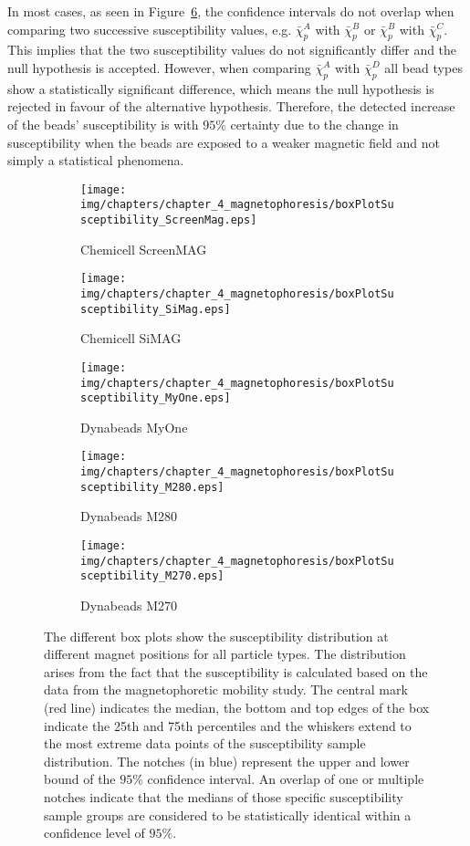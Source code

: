 In most cases, as seen in Figure~\ref{fig:boxPlotSusceptibility}, the confidence intervals do not overlap when comparing two successive susceptibility values, e.g. $\bar{\chi}_{p}^{A}$ with $\bar{\chi}_{p}^{B}$ or $\bar{\chi}_{p}^{B}$ with $\bar{\chi}_{p}^{C}$. This implies that the two susceptibility values do not significantly differ and the null hypothesis is accepted. However, when comparing $\bar{\chi}_{p}^{A}$ with $\bar{\chi}_{p}^{D}$ all bead types show a statistically significant difference, which means the null hypothesis is rejected in favour of the alternative hypothesis. Therefore, the detected increase of the beads' susceptibility is with $95\%$ certainty due to the change in susceptibility when the beads are exposed to a weaker magnetic field and not simply a statistical phenomena.

\begin{figure}[htb]
\begin{subfigure}[b]{.48\textwidth}
\texttt{[image: img/chapters/chapter\_4\_magnetophoresis/boxPlotSusceptibility\_ScreenMag.eps]}
\caption{Chemicell ScreenMAG}\label{fig:boxPlotSus_ScreenMag}
\end{subfigure}
\hfill
\begin{subfigure}[b]{.48\textwidth}
\texttt{[image: img/chapters/chapter\_4\_magnetophoresis/boxPlotSusceptibility\_SiMag.eps]}
\caption{Chemicell SiMAG}\label{fig:boxPlotSus_SiMag}
\end{subfigure}
\begin{subfigure}[b]{.48\textwidth}
\texttt{[image: img/chapters/chapter\_4\_magnetophoresis/boxPlotSusceptibility\_MyOne.eps]}
\caption{Dynabeads MyOne}\label{fig:boxPlotSus_MyOne}
\end{subfigure}
\hfill
\begin{subfigure}[b]{.48\textwidth}
\texttt{[image: img/chapters/chapter\_4\_magnetophoresis/boxPlotSusceptibility\_M280.eps]}
\caption{Dynabeads M280}\label{fig:boxPlotSus_M280}
\end{subfigure}
\begin{subfigure}[b]{.48\textwidth}
\texttt{[image: img/chapters/chapter\_4\_magnetophoresis/boxPlotSusceptibility\_M270.eps]}
\caption{Dynabeads M270}\label{fig:boxPlotSus_M270}
\end{subfigure}
\caption[Box plot of particle susceptibility]{The different box plots show the susceptibility distribution at different magnet positions for all particle types. The distribution arises from the fact that the susceptibility is calculated based on the data from the magnetophoretic mobility study. The central mark (red line) indicates the median, the bottom and top edges of the box indicate the 25th and 75th percentiles and the whiskers extend to the most extreme data points of the susceptibility sample distribution. The notches (in blue) represent the upper and lower bound of the $95\%$ confidence interval. An overlap of one or multiple notches indicate that the medians of those specific susceptibility sample groups are considered to be statistically identical within a confidence level of $95\%$.}
\label{fig:boxPlotSusceptibility}
\end{figure}

